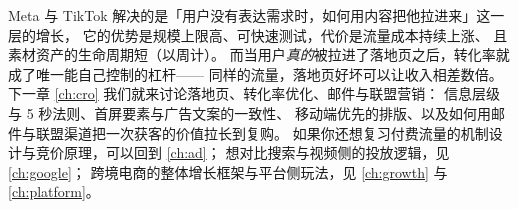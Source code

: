 Meta 与 TikTok 解决的是「用户没有表达需求时，如何用内容把他拉进来」这一层的增长，
它的优势是规模上限高、可快速测试，代价是流量成本持续上涨、
且素材资产的生命周期短（以周计）。
而当用户\emph{真的}被拉进了落地页之后，转化率就成了唯一能自己控制的杠杆——
同样的流量，落地页好坏可以让收入相差数倍。
下一章 \cref{ch:cro} 我们就来讨论落地页、转化率优化、邮件与联盟营销：
信息层级与 5 秒法则、首屏要素与广告文案的一致性、
移动端优先的排版、以及如何用邮件与联盟渠道把一次获客的价值拉长到复购。
如果你还想复习付费流量的机制设计与竞价原理，可以回到 \cref{ch:ad}；
想对比搜索与视频侧的投放逻辑，见 \cref{ch:google}；
跨境电商的整体增长框架与平台侧玩法，见 \cref{ch:growth} 与 \cref{ch:platform}。
